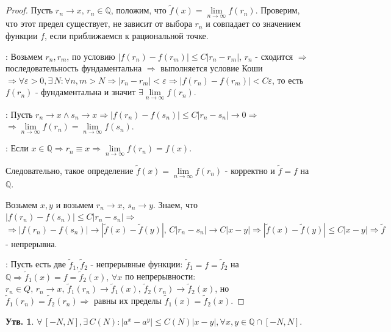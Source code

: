 \documentclass[12pt]{article}
\newcommand{\MQ}{\mathbb{Q}}
\theoremstyle{definition}
\newtheorem{prop}{Утв.}
\begin{document}
\begin{proof}
	Пусть $r_n \to x, \, r_n \in \MQ$, положим, что $\tilde{f}(x) = \lim\limits_{n\to \infty} f(r_n)$. Проверим, что этот предел существует, не зависит от выбора $r_n$ и совпадает со значением функции $f$, если приближаемся к рациональной точке.
	
	: Возьмем $r_n, r_m$, по условию $|f(r_n) - f(r_m)| \leq C|r_n - r_m|$, $r_n$ - сходится $\Rightarrow$ последовательность фундаментальна $\Rightarrow$ выполняется условие Коши $\Rightarrow \forall \varepsilon > 0, \exists \, N \colon \forall n, m > N \Rightarrow |r_n -r_m| < \varepsilon \Rightarrow |f(r_n) - f(r_m)| < C \varepsilon$, то есть $f(r_n)$ - фундаментальна и значит $\exists \lim\limits_{n \to \infty}f(r_n)$.
	
	: Пусть $r_n \to x \wedge s_n \to x \Rightarrow |f(r_n) - f(s_n)| \leq C|r_n - s_n| \to 0 \Rightarrow$ \\
	$\Rightarrow \lim\limits_{n \to \infty}f(r_n) =  \lim\limits_{n \to \infty}f(s_n)$.
	
	: Если $x \in \MQ \Rightarrow r_n \equiv x \Rightarrow \lim\limits_{n \to \infty}f(r_n) = f(x)$. 
	
	Следовательно, такое определение $\tilde{f}(x) = \lim\limits_{n\to \infty} f(r_n)$ - корректно и $\tilde{f} = f$ на $\MQ$. 
	
	Возьмем $x,y$ и возьмем $r_n \to x, \, s_n \to y$. Знаем, что $|f(r_n) - f(s_n)| \leq C|r_n - s_n| \Rightarrow$ \\ 
	$\Rightarrow |f(r_n) - f(s_n)|\to |\tilde{f}(x) - \tilde{f}(y)|, \, C|r_n -s_n| \to C|x-y| \Rightarrow |\tilde{f}(x) - \tilde{f}(y)| \leq C|x-y| \Rightarrow \tilde{f}$ - непрерывна.
	
	: Пусть есть две $\tilde{f}_1, \tilde{f}_2$ - непрерывные функции: $\tilde{f}_1 = f = \tilde{f}_2$ на $\MQ \Rightarrow \tilde{f}_1(x) = f = \tilde{f}_2(x), \, \forall x$ по непрерывности: $r_n \in Q, \, r_n \to x, \, \tilde{f}_1(r_n) \to \tilde{f}_1(x), \, \tilde{f}_2(r_n) \to \tilde{f}_2(x)$, но $\tilde{f}_1(r_n) =  \tilde{f}_2(r_n) \Rightarrow$ равны их пределы $\tilde{f}_1(x) = \tilde{f}_2(x)$.
\end{proof}

\begin{prop}
	 $\forall\, [-N,N], \exists \, C(N) \colon |a^x - a^y| \leq C(N)|x-y|, \forall x,y \in \MQ \cap [-N,N]$.
\end{prop}
\end{document}
